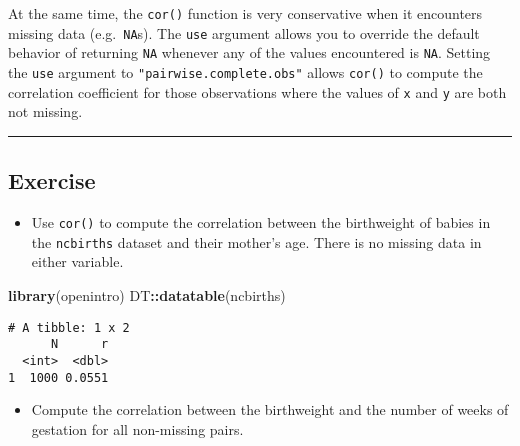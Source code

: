 \documentclass[
]{book}
\newenvironment{Shaded}{\begin{snugshade}}{\end{snugshade}}
\newcommand{\CommentTok}[1]{\textcolor[rgb]{0.56,0.35,0.01}{\textit{#1}}}
\newcommand{\DataTypeTok}[1]{\textcolor[rgb]{0.13,0.29,0.53}{#1}}
\newcommand{\KeywordTok}[1]{\textcolor[rgb]{0.13,0.29,0.53}{\textbf{#1}}}
\newcommand{\NormalTok}[1]{#1}
\newcommand{\OperatorTok}[1]{\textcolor[rgb]{0.81,0.36,0.00}{\textbf{#1}}}
\newcommand{\StringTok}[1]{\textcolor[rgb]{0.31,0.60,0.02}{#1}}
\providecommand{\tightlist}{%
  \setlength{\itemsep}{0pt}\setlength{\parskip}{0pt}}
\begin{document}
At the same time, the \texttt{cor()} function is very conservative when it encounters missing data (e.g.~\texttt{NA}s). The \texttt{use} argument allows you to override the default behavior of returning \texttt{NA} whenever any of the values encountered is \texttt{NA}. Setting the \texttt{use} argument to \texttt{"pairwise.complete.obs"} allows \texttt{cor()} to compute the correlation coefficient for those observations where the values of \texttt{x} and \texttt{y} are both not missing.

\begin{center}\rule{0.5\linewidth}{0.5pt}\end{center}

\hypertarget{exercise-5}{%
\subsection*{Exercise}\label{exercise-5}}

\begin{itemize}
\tightlist
\item
  Use \texttt{cor()} to compute the correlation between the birthweight of babies in the \texttt{ncbirths} dataset and their mother's age. There is no missing data in either variable.
\end{itemize}

\begin{Shaded}
\begin{Highlighting}[]
\KeywordTok{library}\NormalTok{(openintro)}
\NormalTok{DT}\OperatorTok{::}\KeywordTok{datatable}\NormalTok{(ncbirths)}
\end{Highlighting}
\end{Shaded}

\begin{Shaded}
\end{Shaded}

\begin{verbatim}
# A tibble: 1 x 2
      N      r
  <int>  <dbl>
1  1000 0.0551
\end{verbatim}

\begin{itemize}
\tightlist
\item
  Compute the correlation between the birthweight and the number of weeks of gestation for all non-missing pairs.
\end{itemize}
\end{document}
